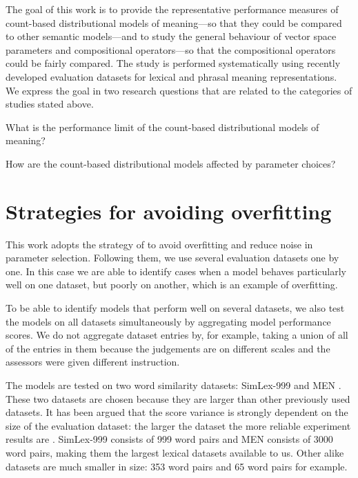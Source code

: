 
The goal of this work is to provide the representative performance measures of count-based distributional models of meaning---so that they could be compared to other semantic models---and to study the general behaviour of vector space parameters and compositional operators---so that the compositional operators could be fairly compared. The study is performed systematically using recently developed evaluation datasets for lexical and phrasal meaning representations. We express the goal in two research questions that are related to the categories of studies stated above.
\begin{compactitem}
\item What is the performance limit of the count-based distributional models of meaning?
\item How are the count-based distributional models affected by parameter choices?
\end{compactitem}

\section{Strategies for avoiding overfitting}
\label{sec:avoiding-overfitting}

This work adopts the strategy of  to avoid overfitting and reduce noise in parameter selection. Following them, we use several evaluation datasets one by one. In this case we are able to identify cases when a model behaves particularly well on one dataset, but poorly on another, which is an example of overfitting.

To be able to identify models that perform well on several datasets, we also test the models on all datasets simultaneously by aggregating model performance scores. We do not aggregate dataset entries by, for example, taking a union of all of the entries in them because the judgements are on different scales and the assessors were given different instruction.

The models are tested on two word similarity datasets: SimLex-999 \cite{hill2014simlex} and MEN \cite{Bruni:2014:MDS:2655713.2655714}. These two datasets are chosen because they are larger than other previously used datasets. It has been argued that the score variance is strongly dependent on the size of the evaluation dataset: the larger the dataset the more reliable experiment results are \cite{W16-2502}. SimLex-999 consists of 999 word pairs and MEN consists of 3000 word pairs, making them the largest lexical datasets available to us. Other alike datasets are much smaller in size: 353 word pairs \cite{2002:PSC:503104.503110} and 65 word pairs \cite{Rubenstein:1965:CCS:365628.365657} for example.
% 

